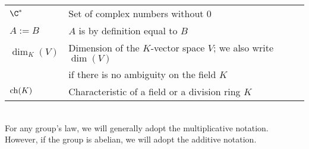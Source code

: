 \begin{tabular}{ll}
   $\C^{\ast}$ & Set of complex numbers without $0$ \\
   $A:=B$ & $A$ is by definition equal to $B$\\
   $\dim_K(V)$ & Dimension of the $K$-vector space $V$; we also write $\dim(V)$ \\& if there is no ambiguity on the field $K$\\
   ${\rm ch}(K)$ & Characteristic of a field or a division ring $K$\\
\end{tabular}\\

For any group's law, we will generally adopt the multiplicative notation. However, if the group is abelian, we will adopt the additive notation. \\